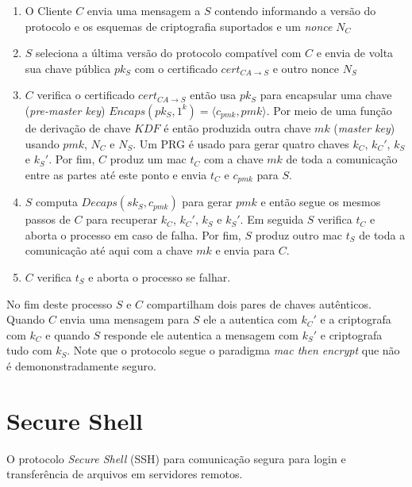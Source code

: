 \begin{enumerate}
\item O Cliente $C$ envia uma mensagem a $S$ contendo informando a versão do protocolo e os esquemas de criptografia suportados e um {\em nonce} $N_C$
\item $S$ seleciona a última versão do protocolo compatível com $C$ e envia de volta sua chave pública $pk_S$ com o certificado $cert_{CA \to S}$ e outro nonce $N_S$
\item $C$ verifica o certificado $cert_{CA \to S}$ então usa $pk_S$ para encapsular uma chave ({\em pre-master key}) $Encaps(pk_S, 1^k) = \langle c_{pmk}, pmk \rangle$.
  Por meio de uma função de derivação de chave $KDF$ é então produzida outra chave $mk$ ({\em master key}) usando $pmk$, $N_C$ e $N_S$.
Um PRG é usado para gerar quatro chaves $k_C$, $k_C'$, $k_S$ e $k_S'$.
Por fim, $C$ produz um mac $t_C$ com a chave $mk$ de toda a comunicação entre as partes até este ponto e envia $t_C$ e $c_{pmk}$ para $S$.
\item $S$ computa $Decaps(sk_S, c_{pmk})$ para gerar $pmk$ e então segue os mesmos passos de $C$ para recuperar $k_C$, $k_C'$, $k_S$ e $k_S'$.
Em seguida $S$ verifica $t_C$ e aborta o processo em caso de falha.
Por fim, $S$ produz outro mac $t_S$ de toda a comunicação até aqui com a chave $mk$ e envia para $C$.
\item $C$ verifica $t_S$ e aborta o processo se falhar.
\end{enumerate}


No fim deste processo $S$ e $C$ compartilham dois pares de chaves autênticos.
Quando $C$ envia uma mensagem para $S$ ele a autentica com $k_C'$ e a criptografa com $k_C$ e quando $S$ responde ele autentica a mensagem com $k_S'$ e criptografa tudo com $k_S$.
Note que o protocolo segue o paradigma {\em mac then encrypt} que não é demononstradamente seguro.


\section{Secure Shell}
\label{sec:ssh}

O protocolo {\em Secure Shell} (SSH) para comunicação segura para login e transferência de arquivos em servidores remotos.

